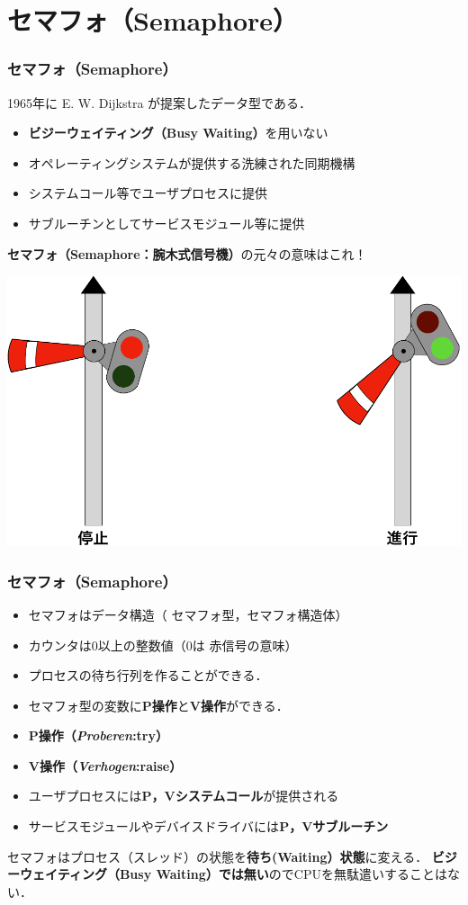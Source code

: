 \documentclass[dvipdfmx]{beamer}
\begin{document}
\section{セマフォ（Semaphore）}
\begin{frame}
  \frametitle{セマフォ（Semaphore）}
  1965年に E. W. Dijkstra が提案したデータ型である．
  \begin{itemize}
  \item {\bf ビジーウェイティング（Busy Waiting）}を用いない
  \item オペレーティングシステムが提供する洗練された同期機構
  \item システムコール等でユーザプロセスに提供
  \item サブルーチンとしてサービスモジュール等に提供
  \end{itemize}

{\bf セマフォ（Semaphore：腕木式信号機）}の元々の意味はこれ！

\begin{center}
\includegraphics[scale=0.35]{Fig/semaphore-crop.pdf}
\end{center}
\end{frame}

\begin{frame}
  \frametitle{セマフォ（Semaphore）}
  \begin{itemize}
  \item セマフォはデータ構造（{\color{red} セマフォ型}，セマフォ構造体）
  \item カウンタは0以上の整数値（0は{\color{red} 赤信号}の意味）
  \item プロセスの待ち行列を作ることができる．
  \item セマフォ型の変数に{\bf P操作}と{\bf V操作}ができる．
  \item {\bf P操作（{\it Proberen}:try）}
  \item {\bf V操作（{\it Verhogen}:raise）}
  \item ユーザプロセスには{\bf P，Vシステムコール}が提供される
  \item サービスモジュールやデバイスドライバには{\bf P，Vサブルーチン}
  \end{itemize}

セマフォはプロセス（スレッド）の状態を{\bf 待ち(Waiting）状態}に変える．
{\bf ビジーウェイティング（Busy Waiting）では無い}のでCPUを無駄遣いすることはない．
\end{frame}
\end{document}
